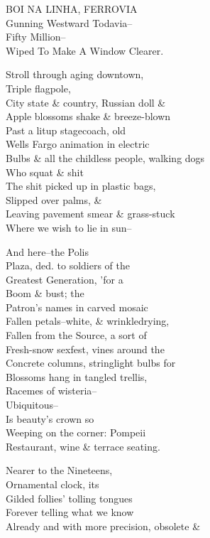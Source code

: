 \qquad BOI NA LINHA, FERROVIA \\
\qquad Gunning Westward Todavia-- \\
\qquad Fifty Million-- \\
\qquad Wiped To Make A Window Clearer.

Stroll through aging downtown, \\
Triple flagpole, \\
City state \& country, Russian doll \& \\
Apple blossoms shake \& breeze-blown \\
Past a litup stagecoach, old \\
Wells Fargo animation in electric \\
Bulbs \& all the childless people, walking dogs \\
Who squat \& shit \\
The shit picked up in plastic bags, \\
Slipped over palms, \& \\
Leaving pavement smear \& grass-stuck \\
Where we wish to lie in sun--

And here--the Polis \\
Plaza, ded. to soldiers of the \\
Greatest Generation, 'for a \\
Boom \& bust; the \\
Patron's names in carved mosaic \\
Fallen petals--white, \& wrinkledrying, \\
Fallen from the Source, a sort of \\
Fresh-snow sexfest, vines around the \\
Concrete columns, stringlight bulbs for \\
Blossoms hang in tangled trellis, \\
Racemes of wisteria-- \\
Ubiquitous-- \\
Is beauty's crown so \\
Weeping on the corner: Pompeii \\
Restaurant, wine \& terrace seating.

Nearer to the Nineteens, \\
Ornamental clock, its \\
Gilded follies' tolling tongues \\
Forever telling what we know \\
Already and with more precision, obsolete \&

